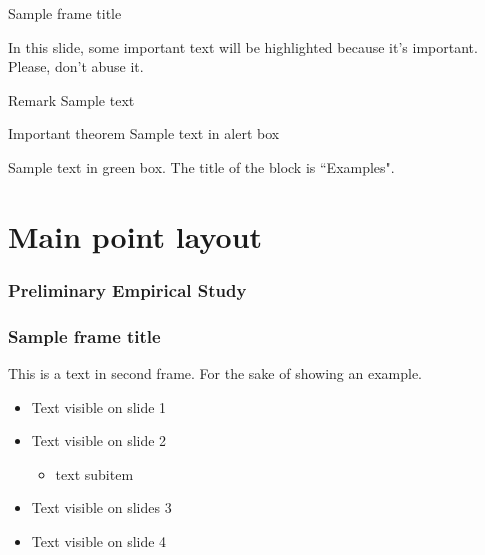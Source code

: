     \begin{frame}{Sample frame title}

        In this slide, some important text will be
        \alert{highlighted} because it's important. Please, don't abuse it.

        \begin{block}{Remark}
            Sample text
        \end{block}

        \begin{alertblock}{Important theorem}
            Sample text in alert box
        \end{alertblock}

        \begin{examples}
            Sample text in green box. The title of the block is ``Examples".
        \end{examples}

    \end{frame}




    \section{Main point layout}

    \begin{frame}{}
        \frametitle{Preliminary Empirical Study}
    \end{frame}

    \begin{frame}
        \frametitle{Sample frame title}
        This is a text in second frame. For the sake of showing an example.

        \begin{itemize}
            \item<1-> Text visible on slide 1
            \item<2-> Text visible on slide 2
            \begin{itemize}
                \item text subitem
            \end{itemize}
            \item<3> Text visible on slides 3
            \item<4-> Text visible on slide 4
        \end{itemize}
    \end{frame}